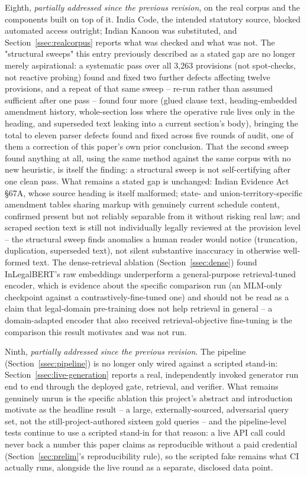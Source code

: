 \documentclass[conference]{IEEEtran}
\begin{document}
Eighth, \emph{partially addressed since the previous revision}, on the real corpus and the components built on top of it. India Code, the intended statutory source, blocked automated access outright; Indian Kanoon was substituted, and Section~\ref{ssec:realcorpus} reports what was checked and what was not. The "structural sweeps" this entry previously described as a stated gap are no longer merely aspirational: a systematic pass over all 3{,}263 provisions (not spot-checks, not reactive probing) found and fixed two further defects affecting twelve provisions, and a repeat of that same sweep -- re-run rather than assumed sufficient after one pass -- found four more (glued clause text, heading-embedded amendment history, whole-section loss where the operative rule lives only in the heading, and superseded text leaking into a current section's body), bringing the total to eleven parser defects found and fixed across five rounds of audit, one of them a correction of this paper's own prior conclusion. That the second sweep found anything at all, using the same method against the same corpus with no new heuristic, is itself the finding: a structural sweep is not self-certifying after one clean pass. What remains a stated gap is unchanged: Indian Evidence Act \S67A, whose source heading is itself malformed; state- and union-territory-specific amendment tables sharing markup with genuinely current schedule content, confirmed present but not reliably separable from it without risking real law; and scraped section text is still not individually legally reviewed at the provision level -- the structural sweep finds anomalies a human reader would notice (truncation, duplication, superseded text), not silent substantive inaccuracy in otherwise well-formed text. The dense-retrieval ablation (Section~\ref{ssec:dense}) found InLegalBERT's raw embeddings underperform a general-purpose retrieval-tuned encoder, which is evidence about the specific comparison run (an MLM-only checkpoint against a contrastively-fine-tuned one) and should not be read as a claim that legal-domain pre-training does not help retrieval in general -- a domain-adapted encoder that also received retrieval-objective fine-tuning is the comparison this result motivates and was not run.

Ninth, \emph{partially addressed since the previous revision}. The pipeline (Section~\ref{ssec:pipeline}) is no longer only wired against a scripted stand-in: Section~\ref{ssec:live-generation} reports a real, independently invoked generator run end to end through the deployed gate, retrieval, and verifier. What remains genuinely unrun is the specific ablation this project's abstract and introduction motivate as the headline result -- a large, externally-sourced, adversarial query set, not the still-project-authored sixteen gold queries -- and the pipeline-level tests continue to use a scripted stand-in for that reason: a live API call could never back a number this paper claims as reproducible without a paid credential (Section~\ref{sec:prelim}'s reproducibility rule), so the scripted fake remains what CI actually runs, alongside the live round as a separate, disclosed data point.
\end{document}
